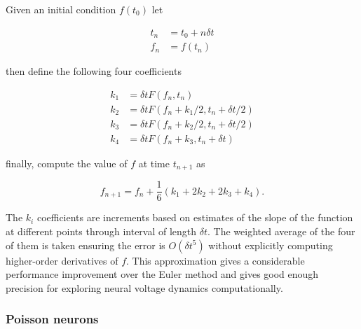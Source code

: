 \documentclass[12pt]{extarticle}
\begin{document}
Given an initial condition $f(t_0)$ let

\begin{equation}
\begin{aligned}
t_n &= t_0 + n\delta t \\
f_n &= f(t_n)
\end{aligned}
\end{equation}

then define the following four coefficients

\begin{equation}
\begin{aligned}
k_1 &= \delta t F(f_n,t_n) \\
k_2 &= \delta t F(f_n + k_1/2, t_n + \delta t /2) \\
k_3 &= \delta t F(f_n + k_2/2, t_n + \delta t /2) \\
k_4 &= \delta t F(f_n + k_3, t_n + \delta t)
\end{aligned}
\end{equation}

finally, compute the value of $f$ at time $t_{n+1}$ as

\begin{equation}
f_{n+1} = f_n  + \frac{1}{6}(k_1 + 2k_2 + 2k_3 + k_4).
\end{equation}

\noindent
The $k_i$ coefficients are increments based on estimates of the slope
of the function at different points through interval of length $\delta
t$. The weighted average of the four of them is taken ensuring the
error is $O(\delta t^5)$ without explicitly computing higher-order
derivatives of $f$. This approximation gives a considerable
performance improvement over the Euler method and gives good enough
precision for exploring neural voltage dynamics computationally.\\

\subsubsection*{Poisson neurons}

\end{document}
